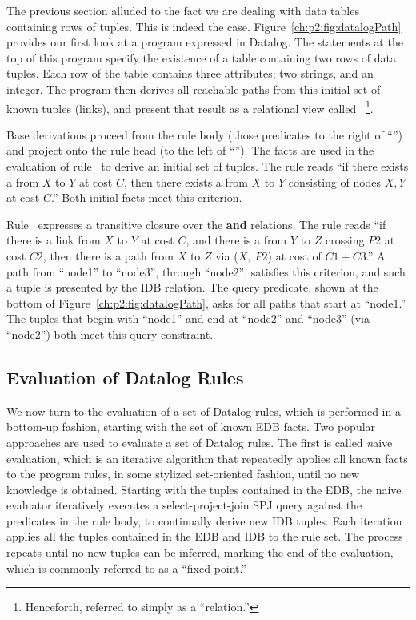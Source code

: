 The previous section alluded to the fact we are dealing with data tables
containing rows of tuples.  This is indeed the case.
Figure~\ref{ch:p2:fig:datalogPath} provides our first look at a program
expressed in Datalog.  The statements at the top of this program specify the
existence of a  table containing two rows of data tuples.  Each row of
the  table contains three attributes; two strings, and an integer.
The program then derives all reachable paths from this initial set of known
tuples (links), and present that result as a relational view called 
~\footnote{Henceforth, referred to simply as a ``relation.''}.

Base derivations proceed from the rule body (those predicates to the right of
``\ol{:-}'') and project onto the rule head (to the left of ``\ol{:-}'').  The
 facts are used in the evaluation of rule~ to derive an initial
set of  tuples.  The rule reads ``if there exists a  from $X$
to $Y$ at cost $C$, then there exists a  from $X$ to $Y$ consisting of
nodes $X, Y$ at cost $C$.'' Both initial facts meet this criterion.

Rule~ expresses a transitive closure over the  {\bf and}
 relations.  The rule reads ``if there is a link from $X$ to $Y$ at
cost $C$, and there is a  from $Y$ to $Z$ crossing $P2$ at cost $C2$,
then there is a path from $X$ to $Z$ via ($X,\ P2$) at cost of $C1+C3$.'' A
path from ``node1'' to ``node3'', through ``node2'', satisfies this criterion,
and such a tuple is presented by the  IDB relation.  The query
predicate, shown at the bottom of Figure~\ref{ch:p2:fig:datalogPath}, asks for
all paths that start at ``node1.'' The  tuples that begin
with ``node1'' and end at ``node2'' and ``node3'' (via ``node2'') both meet
this query constraint.

\subsection{Evaluation of Datalog Rules}

We now turn to the evaluation of a set of Datalog rules, which is performed in
a bottom-up fashion, starting with the set of known EDB facts.  Two popular
approaches are used to evaluate a set of Datalog rules.  The first is called
{\emph naive evaluation}, which is an iterative algorithm that repeatedly
applies all known facts to the program rules, in some stylized set-oriented
fashion, until no new knowledge is obtained.  Starting with the tuples
contained in the EDB, the naive evaluator iteratively executes a
select-project-join SPJ query against the predicates in the rule body, to
continually derive new IDB tuples.  Each iteration applies all the tuples
contained in the EDB and IDB to the rule set.  The process repeats until no new
tuples can be inferred, marking the end of the evaluation, which is commonly
referred to as a ``fixed point.''

